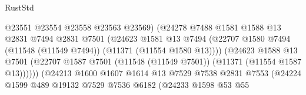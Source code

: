 \begin{lexlean}{RustStd}
\begin{coremodule}
                                          @23551
                                          @23554
                                          @23558
                                          @23563
                                          @23569)
                                        (@24278
                                          @7488
                                          @1581
                                          @1588
                                          @13
                                          @2831
                                          @7494
                                          @2831
                                          @7501
                                          (@24623
                                            @1581
                                            @13
                                            @7494
                                            (@22707
                                              @1580
                                              @7494
                                              (@11548 (@11549 @7494))
                                              (@11371 (@11554 @1580 @13))))
                                          (@24623
                                            @1588
                                            @13
                                            @7501
                                            (@22707
                                              @1587
                                              @7501
                                              (@11548 (@11549 @7501))
                                              (@11371 (@11554 @1587 @13))))))
                                      (@24213
                                        @1600
                                        @1607
                                        @1614
                                        @13
                                        @7529
                                        @7538
                                        @2831
                                        @7553
                                        (@24224
                                          @1599
                                          @489
                                          @19132
                                          @7529
                                          @7536
                                          @6182
                                          (@24233
                                            @1598
                                            @53
                                            @55

\end{coremodule}
\end{lexlean}
